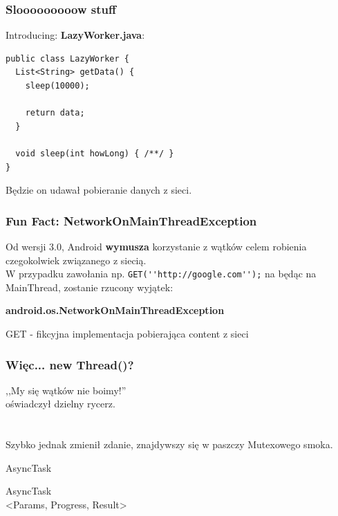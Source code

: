 \documentclass{beamer}
\begin{document}
\begin{frame}[fragile]\frametitle{Slooooooooow stuff}
Introducing: \textbf{LazyWorker.java}:
\begin{lstlisting}
public class LazyWorker {
  List<String> getData() {
    sleep(10000); 

    return data;
  }
  
  void sleep(int howLong) { /**/ }
}
\end{lstlisting}
Będzie on udawał pobieranie danych z sieci.
\end{frame}

\begin{frame}[fragile]\frametitle{Fun Fact: \textbf{NetworkOnMainThreadException}}

Od wersji 3.0, Android \textbf{wymusza} korzystanie z wątków celem robienia czegokolwiek
związanego z siecią.\\ 
W przypadku zawołania np. \verb|GET(''http://google.com'');| na będąc na MainThread, 
zostanie rzucony wyjątek:

\begin{center}
  \textbf{android.os.NetworkOnMainThreadException}
 \end{center}

\begin{flushright}
\small{GET - fikcyjna implementacja pobierająca content z sieci}
\end{flushright}
\end{frame}

\begin{frame}\frametitle{Więc... new Thread()?}
\begin{center}
 ,,My się wątków nie boimy!''\\
 oświadczył dzielny rycerz.\\

\pause 
\ \\
\ \\
Szybko jednak zmienił zdanie, znajdywszy się w paszczy Mutexowego smoka.
\end{center}
\end{frame}

\begin{frame}
 \begin{center}
  \Huge{AsyncTask}
 \end{center}
\end{frame}

\begin{frame}
 \begin{center}
  \Huge{AsyncTask\\ <Params, Progress, Result>}
 \end{center}
\end{frame}
\end{document}
